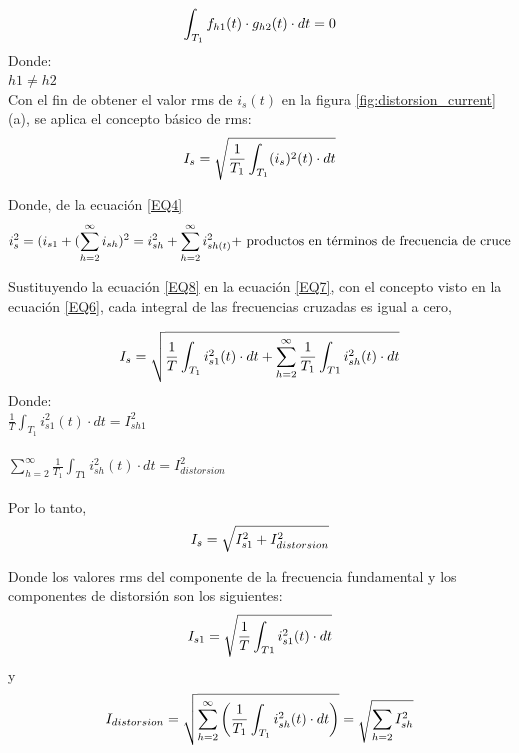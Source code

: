 \begin{equation}\label{EQ6}
\int_{T_{1}}^{}f_{h1}(t) \cdot g_{h2}(t) \cdot dt = 0\\
\end{equation}
Donde:\\
$h1 \neq h2$\\

Con el fin de obtener el valor rms de $i_{s}(t)$ en la figura \ref{fig:distorsion_current}(a), se aplica el concepto básico de rms:\\

\begin{equation}\label{EQ7}
I_{s}=\sqrt{\frac{1}{T_{1}}\int_{T_{1}}^{}(i_{s})^2(t) \cdot dt}\\
\end{equation}


Donde, de la ecuación \ref{EQ4}\\

\begin{equation}\label{EQ8}
i^2_{s}=(i_{s1}+ (\sum_{h=2}^{\infty}i_{sh})^2 = i^2_{sh} + \sum_{h=2}^{\infty}i^2_{sh(t)} \\ 
$+ productos en términos de frecuencia de cruce$
\end{equation}

Sustituyendo la ecuación \ref{EQ8} en la ecuación \ref{EQ7}, con el concepto visto en la ecuación \ref{EQ6}, cada integral de las frecuencias cruzadas es igual a cero,

\begin{equation}\label{EQ9}
I_{s} = \sqrt{\frac{1}{T}\int_{T_{1}}^{}i^2_{s1}(t) \cdot dt + \sum_{h=2}^{\infty}\frac{1}{T_{1}}\int_{T1}^{}i^2_{sh}(t)\cdot dt}\\
\end{equation}
Donde:\\
$\frac{1}{T}\int_{T_{1}}^{}i^2_{s1}(t) \cdot dt = I^2_{sh1}$\\\\
$\sum_{h=2}^{\infty}\frac{1}{T_{1}}\int_{T1}^{}i^2_{sh}(t)\cdot dt = I^2_{distorsion}$\\\\
Por lo tanto,\\
\begin{equation}\label{EQ10}
I_{s} = \sqrt{I^2_{s1}+I^2_{distorsion}}\\\\
\end{equation}

Donde los valores rms del componente de la frecuencia fundamental y los componentes de distorsión son los siguientes:\\
\begin{equation}\label{EQ11}
I_{s1}=\sqrt{\frac{1}{T}\int_{T1}^{}i^2_{s1}(t) \cdot dt}\\
\end{equation}
y\\
\begin{equation}\label{EQ12}
I_{distorsion}=\sqrt{\sum_{h=2}^{\infty}\left(\frac{1}{T_{1}}\int_{T_{1}}^{}i^2_{sh}(t)\cdot dt\right)}=\sqrt{\sum_{h=2}^{}I^2_{sh}}\\\\
\end{equation}

